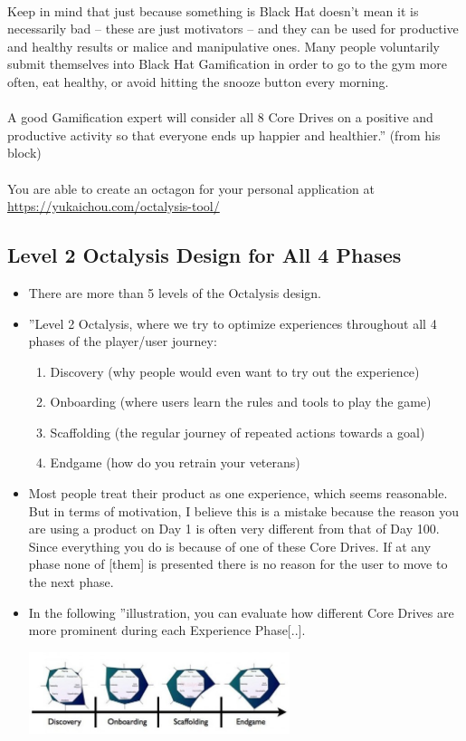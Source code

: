 \\
Keep in mind that just because something is Black Hat doesn’t mean it is necessarily bad – these are just motivators – and they can be used for productive and healthy results or malice and manipulative ones. Many people voluntarily submit themselves into Black Hat Gamification in order to go to the gym more often, eat healthy, or avoid hitting the snooze button every morning.\\
\\
A good Gamification expert will consider all 8 Core Drives on a positive and productive activity so that everyone ends up happier and healthier.'' (from his block)\\
\\
You are able to create an octagon for your personal application at \url{https://yukaichou.com/octalysis-tool/}

\subsection{Level 2 Octalysis Design for All 4 Phases}
\begin{itemize}
    \item There are more than 5 levels of the Octalysis design.
    \item ''Level 2 Octalysis, where we try to optimize experiences throughout all 4 phases of the player/user journey:
    \begin{enumerate}
        \item Discovery (why people would even want to try out the experience)
        \item Onboarding (where users learn the rules and tools to play the game)
        \item Scaffolding (the regular journey of repeated actions towards a goal)
        \item Endgame (how do you retrain your veterans)
    \end{enumerate}
    \item Most people treat their product as one experience, which seems reasonable. But in terms of motivation, I believe this is a mistake because the reason you are using a product on Day 1 is often very different from that of Day 100. Since everything you do is because of one of these Core Drives. If at any phase none of [them] is presented there is no reason for the user to move to the next phase.
    \item In the following ''illustration, you can evaluate how different Core Drives are more prominent during each Experience Phase[..].
    \begin{center}
            \includegraphics[width=0.6\textwidth]{images/Gamification-Octalysis.018-e1363796378415.jpg}
    \end{center}
\end{itemize}


